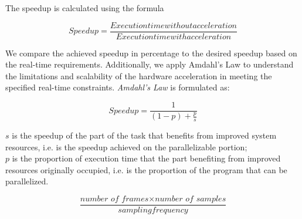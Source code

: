 The speedup is calculated using the formula

\begin{equation}
    Speedup = \frac{Execution time without acceleration}{Execution time with acceleration} 
\end{equation}

We compare the achieved speedup in percentage to the desired speedup based on the real-time requirements. Additionally, we apply Amdahl's Law to understand the limitations and scalability of the hardware acceleration in meeting the specified real-time constraints. \textit{Amdahl's Law} is formulated as:

\begin{equation}
    Speedup = \frac{1}{(1 - p) + \frac{p}{s}} 
\end{equation}

$s$ is the speedup of the part of the task that benefits from improved system resources, i.e. is the speedup achieved on the parallelizable portion;\\
$p$ is the proportion of execution time that the part benefiting from improved resources originally occupied, i.e. is the proportion of the program that can be parallelized.

\begin{equation}
    \frac{\textit{number of frames} \times \textit{number of samples}}{sampling frequency} 
\end{equation}
